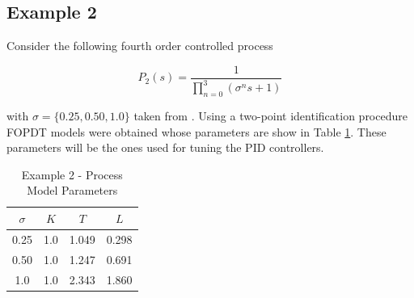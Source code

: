 %
\subsection{Example 2}
%

Consider the following fourth order controlled process

\begin{equation}
    P_2(s)= \frac{1}{\prod^{3}_{n=0}(\sigma^ns+1)}\label{system_example2}
\end{equation}

\noindent with $\sigma=\{0.25, 0.50, 1.0\}$ taken from
\cite{ayh2000}. Using a two-point identification procedure
\cite{alfaro2006-1} FOPDT models were obtained whose parameters
are show in Table \ref{models2}. These parameters will be the ones
used for tuning the PID controllers.

\begin{table}[htb!]
\caption{Example 2 - Process Model Parameters} \label{models2}
\centering
\begin{tabular}{c|*{3}{c}}
\hline
$\sigma$ & $K$ & $T$   & $L$   \\
\hline
0.25     & 1.0 & 1.049 & 0.298 \\
0.50     & 1.0 & 1.247 & 0.691 \\
1.0      & 1.0 & 2.343 & 1.860 \\
\hline
\end{tabular}
\end{table}

